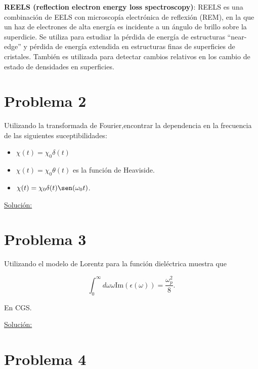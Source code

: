 \documentclass[a4paper,11pt]{article}
\numberwithin{equation}{section}
\begin{document}
\vspace{.3cm}

\textbf{REELS (reflection electron energy loss spectroscopy)}: REELS es una combinación 
de EELS con microscopía electrónica de reflexión (REM), en la que un haz de electrones 
de alta energía es incidente a un ángulo de brillo sobre la superdicie. Se utiliza 
para estudiar la pérdida de energía de estructuras ``near-edge'' y pérdida de energía 
extendida en estructuras finas de superficies de cristales. También es 
utilizada para detectar cambios relativos en los cambio de estado de densidades 
en superficies.

\section{Problema 2}

Utilizando la transformada de Fourier,encontrar la dependencia en la frecuencia de las siguientes suceptibilidades:

\begin{itemize}
 \item $\chi(t) = \chi_0 \delta(t)$
 \item $\chi(t) = \chi_0\theta(t)$ es la función de Heaviside.
 \item $\chi(t) = \chi_0\delta(t)\sen(\omega_0 t)$.
\end{itemize}

\vspace{.3cm}

\underline{Solución:} \vspace{.3cm}

\section{Problema 3}

Utilizando el modelo de Lorentz para la función dieléctrica muestra que 

$$
\int_0^\infty d\omega \omega \text{Im}(\epsilon(\omega)) = \frac{\omega_p^2}{8}.
$$

En CGS.

\vspace{.3cm}

\underline{Solución:} \vspace{.3cm}

\section{Problema 4}
\end{document}
